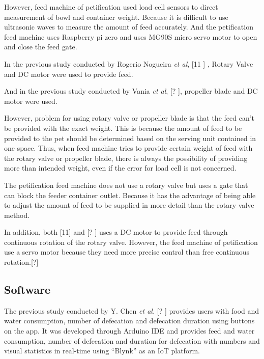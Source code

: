 \documentclass[conference]{IEEEtran}
\begin{document}
However, feed machine of petification used load cell sensors to direct measurement of bowl and container weight. Because it is difficult to use ultrasonic waves to measure the amount of feed accurately. And the petification feed machine uses Raspberry pi zero and uses MG90S micro servo motor to open and close the feed gate. 

 In the previous study conducted by Rogerio Nogueira \textit{et al}, [11
] , Rotary Valve and DC motor were used to provide feed.

And in the previous study conducted by Vania \textit{et al}, [?
], propeller blade and DC motor were used.

However, problem for using rotary valve or propeller blade is that the feed can’t be provided with the exact weight. This is because the amount of feed to be provided to the pet should be determined based on the serving unit contained in one space. Thus, when feed machine tries to provide certain weight of feed with the rotary valve or propeller blade, there is always the possibility of providing more than intended weight, even if the error for load cell is not concerned.

The petification feed machine does not use a rotary valve but uses a gate that can block the feeder container outlet. Because it has the advantage of being able to adjust the amount of feed to be supplied in more detail than the rotary valve method.

In addition, both [11] and [?
] uses a DC motor to provide feed through continuous rotation of the rotary valve. However, the feed machine of petification use a servo motor because they need more precise control than free continuous rotation.[?] 

\subsection{Software}
  The previous study conducted by Y. Chen \textit{et al.} [?
] 
provides users with food and water consumption, number of defecation and defecation duration using buttons on the app. It was developed through Arduino IDE and provides feed and water consumption, number of defecation and duration for defecation with numbers and visual statistics in real-time using “Blynk” as an IoT platform.
\end{document}

